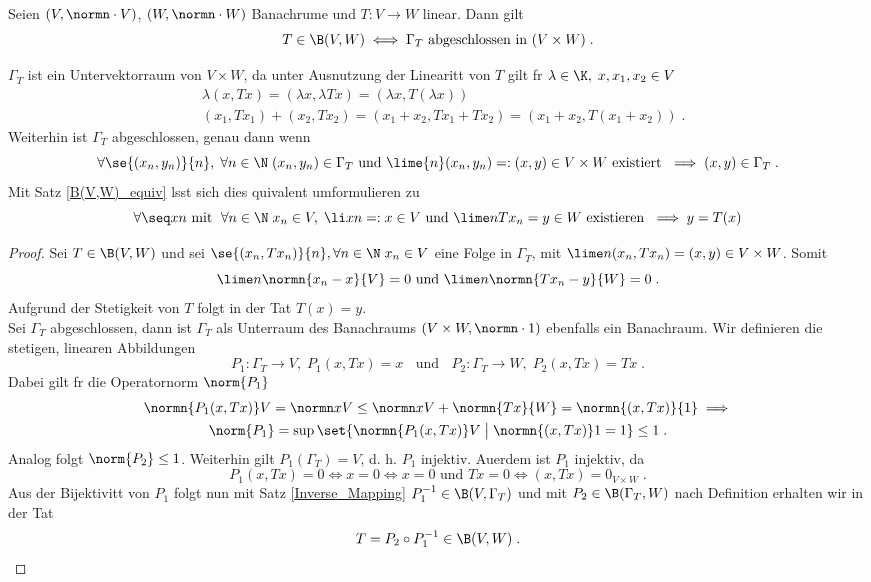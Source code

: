 \begin{theorem}
Seien \((V,\normn\cdot V)\), \((W,\normn\cdot W)\) Banachr\as ume und \(T:V\to W\) linear. Dann gilt
\[T \in \B(V,W) \iff \Gamma_T \text{ abgeschlossen in }(V\times W)\;.\]
\label{closed_graph}
\end{theorem}
\begin{rem}
	\(\Gamma_T\) ist ein Untervektorraum von \(V\times W\), da unter Ausnutzung der Linearit\as t von $T$ gilt f\us r \(\lambda \in \K,\; x, x_1, x_2 \in V\)
	\begin{align*}
		& \lambda (x, Tx) = (\lambda x, \lambda Tx) = (\lambda x, T(\lambda x)) \\
		& (x_1, Tx_1) + (x_2, Tx_2) = (x_1 + x_2, Tx_1 + Tx_2) = (x_1 + x_2, T(x_1 + x_2))\;.
	\end{align*}
	Weiterhin ist \(\Gamma_T\) abgeschlossen, genau dann wenn 
	\[\forall \se{(x_n, y_n)}{n},\;\forall n\in\N \;(x_n, y_n) \in \Gamma_T \text{ und } \lime{n} (x_n, y_n) =:(x,y) \in V\times W \text{ existiert } \implies (x,y) \in \Gamma_T\;.\]
	Mit Satz \ref{B(V,W)_equiv} l\as sst sich dies \as quivalent umformulieren zu
	\[\forall \seq xn \text{ mit }\;\forall n\in \N\; x_n \in V,\;\li xn =: x \in V  \text{ und } \lime n {Tx_n} = y \in W\text{ existieren } \implies y = T(x)\]
\end{rem}
\begin{proof}
	\forw Sei \(T\in \B(V,W)\) und sei \(\se{(x_n, Tx_n)}{n}, \forall n\in \N\; x_n \in V\) eine Folge in \(\Gamma_T\), mit \(\lime n (x_n, Tx_n) = (x,y) \in V\times W\).  Somit 
	\[\lime n\normn{x_n - x}{V}  = 0 \text{ und } \lime n \normn{Tx_n - y}{W} = 0\;.\]
	Aufgrund der Stetigkeit von $T$ folgt in der Tat \(T(x) = y\).\\
	\backw Sei \(\Gamma_T\) abgeschlossen, dann ist \(\Gamma_T\) als Unterraum des Banachraums \((V\times W,\normn\cdot 1)\) ebenfalls ein Banachraum. Wir definieren die stetigen, linearen Abbildungen
	\[P_1: \Gamma_T \to V,\; P_1(x,Tx) = x \;\;\text{ und }\;\; P_2: \Gamma_T\to W,\; P_2(x,Tx) = Tx\;.\]
	Dabei gilt f\us r die Operatornorm $\norm{P_1}$
	\begin{multline*}
	\normn{P_1(x,Tx)}V = \normn xV \leq \normn xV + \normn{Tx}{W} = \normn{(x,Tx)}{1} \implies \\ \norm{P_1} = \sup \set{ \normn{P_1(x,Tx)}V\;\big\vert\;\normn{(x,Tx)}1 = 1}\leq 1\;.
	\end{multline*}
	Analog folgt \(\norm{P_2} \leq 1\). Weiterhin gilt \(P_1(\Gamma_T) = V\), d. h. $P_1$ injektiv. Au\s erdem ist $P_1$ injektiv, da
	\[P_1(x,Tx) = 0 \iff x = 0 \iff x = 0 \text{ und } Tx = 0 \iff (x,Tx) = 0_{V\times W}\;.\]
	Aus der Bijektivit\as t von $P_1$ folgt nun mit Satz \ref{Inverse_Mapping} \(P_1^{-1} \in \B(V,\Gamma_T)\) und mit \(P_2 \in \B(\Gamma_T, W)\) nach Definition erhalten wir in der Tat
	\[T = P_2 \circ P_1^{-1} \in \B(V,W)\;.\]
\end{proof}

